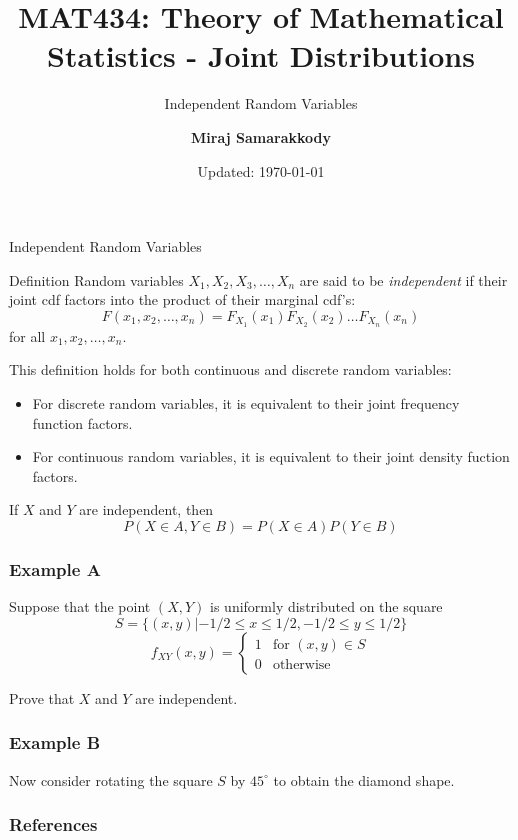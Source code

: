 \documentclass{beamer}
\title{MAT434: Theory of Mathematical Statistics - Joint Distributions}
\subtitle{Independent Random Variables \cite{RJA2006}}
\author{\textbf{Miraj Samarakkody}}
\institute{Tougaloo College}
\date{Updated: \today}
\begin{document}
\begin{frame}
    \titlepage
\end{frame}




\begin{frame}{Independent Random Variables}
    \begin{block}{Definition}
        Random variables \(X_1,X_2, X_3, \dots, X_n\) are said to be \textit{independent} if their joint cdf factors into the product of their marginal cdf's:
        \[F(x_1, x_2, \dots, x_n)= F_{X_1}(x_1)F_{X_2}(x_2)\dots F_{X_n}(x_n)\] for all \(x_1, x_2, \dots, x_n\). 
    \end{block}\pause
    \vspace{0.5cm}  

    This definition holds for both continuous and discrete random variables:\pause
    \begin{itemize}
        \item For discrete random variables, it is equivalent to their joint frequency function factors.\pause
        \item For continuous random variables, it is equivalent to their joint density fuction factors. 
    \end{itemize}
\end{frame}

\begin{frame}{}
    If \(X\) and \(Y\) are independent, then \[P(X \in A, Y \in B) = P(X \in A)P(Y \in B)\]
\end{frame}

\begin{frame}
    \frametitle{Example A}

    Suppose that the point \((X,Y)\) is uniformly distributed on the square 
    \[S= \{(x,y)| -1/2 \leq x \leq 1/2, -1/2 \leq y \leq 1/2\}\]
    \[f_{XY}(x,y)=\begin{cases}
        1 & \text{for } (x,y) \in S\\
        0 & \text{otherwise}
    \end{cases}\]
    
    Prove that \(X\) and \(Y\) are independent.

\end{frame}

\begin{frame}
    \frametitle{Example B}
Now consider rotating the square \(S\) by \(45^{\circ}\) to obtain the diamond shape.
\end{frame}
\begin{frame}
    \frametitle{References}
\end{frame}
\end{document}
